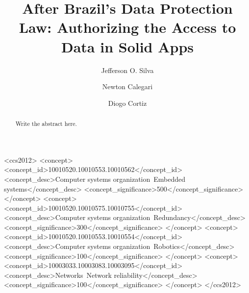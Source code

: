 \documentclass[sigconf]{acmart}
\begin{document}
%
\title{After Brazil's Data Protection Law: Authorizing the Access to Data in Solid Apps}

%
\author{Jefferson O. Silva}

\author{Newton Calegari}

\author{Diogo Cortiz}

%
\renewcommand{\shortauthors}{Silva et al.}

%
\begin{abstract}
Write the abstract here.

\end{abstract}

%
%
\begin{CCSXML}
<ccs2012>
 <concept>
  <concept_id>10010520.10010553.10010562</concept_id>
  <concept_desc>Computer systems organization~Embedded systems</concept_desc>
  <concept_significance>500</concept_significance>
 </concept>
 <concept>
  <concept_id>10010520.10010575.10010755</concept_id>
  <concept_desc>Computer systems organization~Redundancy</concept_desc>
  <concept_significance>300</concept_significance>
 </concept>
 <concept>
  <concept_id>10010520.10010553.10010554</concept_id>
  <concept_desc>Computer systems organization~Robotics</concept_desc>
  <concept_significance>100</concept_significance>
 </concept>
 <concept>
  <concept_id>10003033.10003083.10003095</concept_id>
  <concept_desc>Networks~Network reliability</concept_desc>
  <concept_significance>100</concept_significance>
 </concept>
</ccs2012>
\end{CCSXML}
\end{document}
